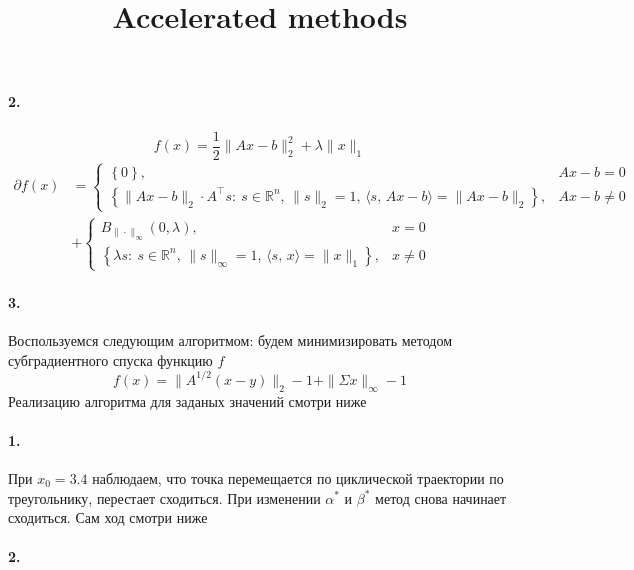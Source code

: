 \documentclass{article}
\newcommand*{\R}{\mathbb{R}}
\begin{document}
\paragraph{2.}
\[ f(x) = \frac12 \| Ax - b \|_2^2 + \lambda \|x\|_1 \]
\[ \begin{aligned}
    \partial f(x)
    &= \begin{cases}    
        \left\{ 0 \right\}, & Ax - b = 0 \\
        \left\{ \| Ax - b \|_2 \cdot A^\top s :\: s \in \R^n,\, \| s \|_2 = 1,\, \langle s,\, Ax - b \rangle = \| Ax - b \|_2 \right\}, & Ax - b \neq 0 
    \end{cases} \\ 
    &+ \begin{cases}
        B_{\| \cdot \|_\infty}(0, \lambda), & x = 0 \\
        \left\{ \lambda s :\: s \in \R^n,\, \|s\|_\infty = 1,\, \langle s,\, x \rangle = \|x\|_1 \right\}, & x \neq 0
    \end{cases}
\end{aligned} \]


\paragraph{3.} Воспользуемся следующим алгоритмом: будем минимизировать методом субградиентного спуска функцию $f$
\[ f(x) = \| A^{1/2} (x - y) \|_2 - 1 + \| \Sigma x \|_\infty - 1 \]
Реализацию алгоритма для заданых значений смотри ниже


\title{Accelerated methods}
\maketitle

\paragraph{1.} При $x_0 = 3.4$ наблюдаем, что точка перемещается по циклической траектории по треугольнику, перестает сходиться. При изменении $\alpha^\ast$ и $\beta^\ast$ метод снова начинает сходиться. Сам ход смотри ниже


\paragraph{2.}
\end{document}
